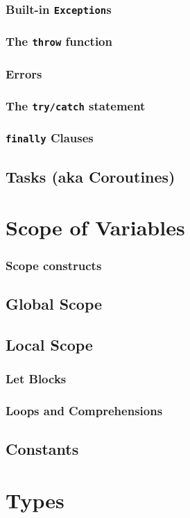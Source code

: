     \subsection{Built-in \texttt{Exception}s}
    \subsection{The \texttt{throw} function}
    \subsection{Errors}
    \subsection{The \texttt{try/catch} statement}
    \subsection{\texttt{finally} Clauses}
    \section{Tasks (aka Coroutines)}
  \chapter{Scope of Variables}
    \subsection{Scope constructs}
    \section{Global Scope}
    \section{Local Scope}
    \subsection{Let Blocks}
    \subsection{Loops and Comprehensions}
    \section{Constants}
  \chapter{Types}
